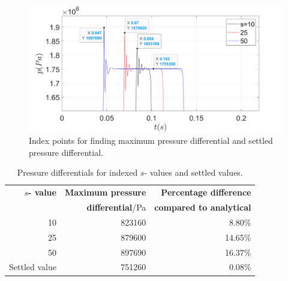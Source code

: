 \begin{figure}[H]
    \centering
    \includegraphics[width = 0.9 \textwidth]{img/fig3.png}
    \caption{Index points for finding maximum pressure differential and settled pressure differential.}
    \label{pressure2}
\end{figure}

\begin{table}[H]
    \centering
    \begin{tabular}{@{}rrr@{}}
        \toprule
        \textbf{$s$- value} & \textbf{Maximum pressure }         & \textbf{Percentage difference}  \\
                            & \textbf{differential}/\si{\pascal} & \textbf{compared to analytical} \\
        \midrule
        10                  & 823160                             & 8.80\%                          \\
        25                  & 879600                             & 14.65\%                         \\
        50                  & 897690                             & 16.37\%                         \\
        Settled value       & 751260                             & 0.08\%                          \\
        \bottomrule
    \end{tabular}
    \caption{Pressure differentials for indexed $s$- values and settled values.}
    \label{matlabResults}
\end{table}
